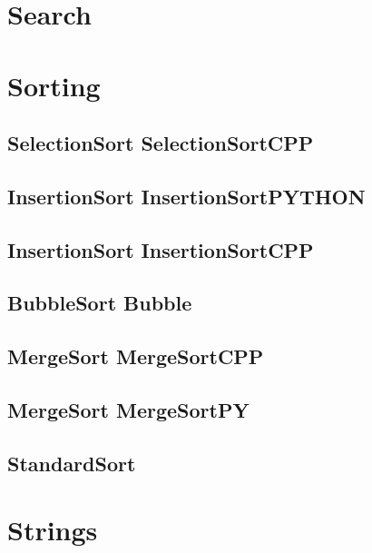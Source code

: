 \section{Search}

\section{Sorting}
\subsection{SelectionSort SelectionSortCPP}
\raggedbottom
\hrulefill
\subsection{InsertionSort InsertionSortPYTHON}
\raggedbottom
\hrulefill
\subsection{InsertionSort InsertionSortCPP}
\raggedbottom
\hrulefill
\subsection{BubbleSort Bubble}
\raggedbottom
\hrulefill
\subsection{MergeSort MergeSortCPP}
\raggedbottom
\hrulefill
\subsection{MergeSort MergeSortPY}
\raggedbottom
\hrulefill
\subsection{ StandardSort}
\raggedbottom
\hrulefill

\section{Strings}
